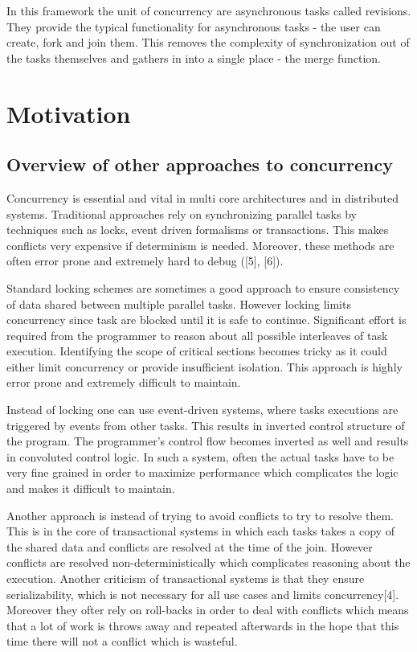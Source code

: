 \documentclass[12pt,twoside,notitlepage]{report}
\begin{document}
In this framework the unit of concurrency are asynchronous tasks called revisions. They provide the typical functionality for asynchronous tasks - the user can create, fork and join them. This removes the complexity of synchronization out of the tasks themselves and gathers in into a single place - the merge function. 

\section{Motivation}

\subsection{Overview of other approaches to concurrency}
 
Concurrency is essential and vital in multi core architectures and in distributed systems. Traditional approaches rely on synchronizing parallel tasks by techniques such as locks, event driven formalisms or transactions. This makes conflicts very expensive if determinism is needed. Moreover, these methods are often error prone and extremely hard to debug ([5], [6]).

Standard locking schemes are sometimes a good approach to ensure consistency of data shared between multiple parallel tasks. However locking limits concurrency since task are blocked until it is safe to continue. Significant effort is required from the programmer to reason about all possible interleaves of task execution. Identifying the scope of critical sections becomes tricky as it could either limit concurrency or provide insufficient isolation. This approach is highly error prone and extremely difficult to maintain.

Instead of locking one can use event-driven systems, where tasks executions are triggered by events from other tasks.  This results in inverted control structure of the program. The programmer's control flow becomes inverted as well and results in convoluted control logic. In such a system, often the actual tasks have to be very fine grained in order to maximize performance which complicates the logic and makes it difficult to maintain.

Another approach is instead of trying to avoid conflicts to try to resolve them. This is in the core of transactional systems in which each tasks takes a copy of the shared data and conflicts are resolved at the time of the join. However conflicts are resolved non-deterministically which complicates reasoning about the execution. Another criticism of transactional systems is that they ensure serializability, which is not necessary for all use cases and limits concurrency[4]. Moreover they ofter rely on roll-backs in order to deal with conflicts which means that a lot of work is throws away and repeated afterwards in the hope that this time there will not a conflict which is wasteful.   
\end{document}
